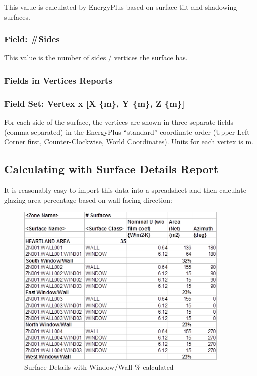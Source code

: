 This value is calculated by EnergyPlus based on surface tilt and shadowing surfaces.

\subsubsection{Field: \#Sides}\label{field-sides}

This value is the number of sides / vertices the surface has.

\subsubsection{Fields in Vertices Reports}\label{fields-in-vertices-reports}

\subsubsection{Field Set: Vertex x {[}X \{m\}, Y \{m\}, Z \{m\}{]}}\label{field-set-vertex-x-x-m-y-m-z-m}

For each side of the surface, the vertices are shown in three separate fields (comma separated) in the EnergyPlus ``standard'' coordinate order (Upper Left Corner first, Counter-Clockwise, World Coordinates). Units for each vertex is m.

\subsection{Calculating with Surface Details Report}\label{calculating-with-surface-details-report}

It is reasonably easy to import this data into a spreadsheet and then calculate glazing area percentage based on wall facing direction:

\begin{figure}[hbtp] %
\centering
\includegraphics[width=0.9\textwidth, height=0.9\textheight, keepaspectratio=true]{media/image012.png}
\caption{Surface Details with Window/Wall \% calculated \protect \label{fig:surface-details-with-windowwall-calculated}}
\end{figure}

